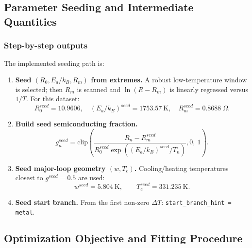 \documentclass[11pt]{article}
\begin{document}
\subsection{Parameter Seeding and Intermediate Quantities}
\subsubsection*{Step-by-step outputs}
The implemented seeding path is:
\begin{enumerate}
    \item \textbf{Seed \((R_0,E_a/k_B,R_m)\) from extremes.}
    A robust low-temperature window is selected; then \(R_m\) is scanned and
    \(\ln(R-R_m)\) is linearly regressed versus \(1/T\).
    For this dataset:
    \[
    R_0^{seed}=10.9606,\quad
    (E_a/k_B)^{seed}=1753.57\ \mathrm{K},\quad
    R_m^{seed}=0.8688\ \Omega.
    \]
    \item \textbf{Build seed semiconducting fraction.}
    \begin{equation}
    g_n^{seed}
    =
    \mathrm{clip}\!\left(
    \frac{R_n-R_m^{seed}}
    {R_0^{seed}\exp\!\left((E_a/k_B)^{seed}/T_n\right)},
    0,\ 1
    \right).
    \label{eq:fit_g_seed}
    \end{equation}
    \item \textbf{Seed major-loop geometry \((w,T_c)\).}
    Cooling/heating temperatures closest to \(g^{seed}=0.5\) are used:
    \[
    w^{seed}=5.804\ \mathrm{K},\qquad
    T_c^{seed}=331.235\ \mathrm{K}.
    \]
    \item \textbf{Seed start branch.}
    From the first non-zero \(\Delta T\): \texttt{start\_branch\_hint = metal}.
\end{enumerate}
\subsection{Optimization Objective and Fitting Procedure}
\end{document}
